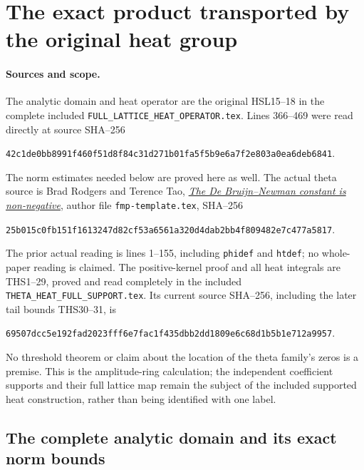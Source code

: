 \section{The exact product transported by the original heat group}
\label{sec:heat-transported-product}

\paragraph{Sources and scope.}
The analytic domain and heat operator are the original HSL15--18
in the complete included \nolinkurl{FULL_LATTICE_HEAT_OPERATOR.tex}.
Lines 366--469 were read directly at source SHA--256
\begin{center}\small
\nolinkurl{42c1de0bb8991f460f51d8f84c31d271b01fa5f5b9e6a7f2e803a0ea6deb6841}.
\end{center}
The norm estimates needed below are proved here as well.
The actual theta source is Brad Rodgers and Terence Tao,
\href{https://arxiv.org/abs/1801.05914v5}{\emph{The De Bruijn--Newman
constant is non-negative}}, author file \nolinkurl{fmp-template.tex},
SHA--256
\begin{center}\small
\nolinkurl{25b015c0fb151f1613247d82cf53a6561a320d4dab2bb4f809482e7c477a5817}.
\end{center}
The prior actual reading is lines 1--155, including
\texttt{phidef} and \texttt{htdef}; no whole-paper reading is
claimed. The positive-kernel proof and all heat integrals are
THS1--29, proved and read completely in the included
\nolinkurl{THETA_HEAT_FULL_SUPPORT.tex}. Its current source
SHA--256, including the later tail bounds THS30--31, is
\begin{center}\small
\nolinkurl{69507dcc5e192fad2023fff6e7fac1f435dbb2dd1809e6c68d1b5b1e712a9957}.
\end{center}
No threshold theorem or claim about the location of the theta
family's zeros is a premise. This is the amplitude-ring
calculation; the independent coefficient supports and their
full lattice map remain the subject of the included supported
heat construction, rather than being identified with one label.

\subsection{The complete analytic domain and its exact norm bounds}

